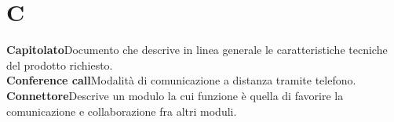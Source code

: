 \newpage
\section{C}\label{l:C}
\textbf{Capitolato}\newline Documento che descrive in linea generale le caratteristiche tecniche del prodotto richiesto.\\
\newline
\textbf{Conference call}\newline Modalità di comunicazione a distanza tramite telefono.\\
\newline
\textbf{Connettore}\newline Descrive un modulo la cui funzione è quella di favorire la comunicazione e collaborazione fra altri moduli.
